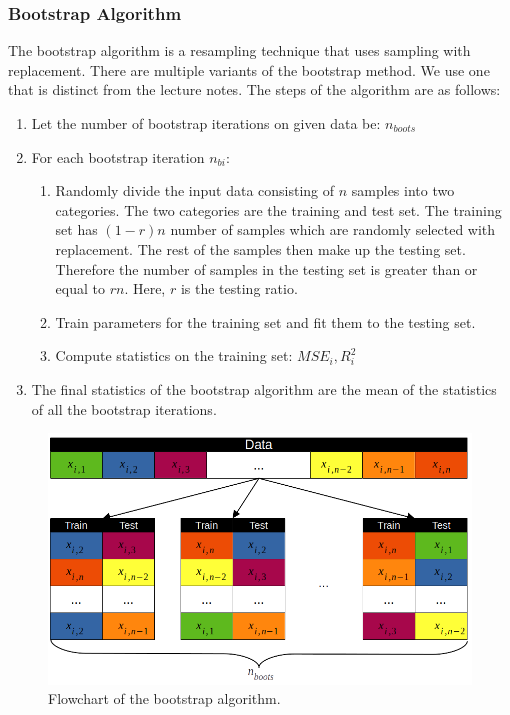 \subsubsection{Bootstrap Algorithm}\label{subsubsec:bootstrap}
The bootstrap algorithm is a resampling technique that uses sampling with replacement. There are multiple variants of the bootstrap method. We use one that is distinct from the lecture notes. \newline
The steps of the algorithm are as follows:
\begin{enumerate}
    \item Let the number of bootstrap iterations on given data be: $n_{boots}$
    \item For each bootstrap iteration $n_{bi}$:
    \begin{enumerate}
        \item Randomly divide the input data consisting of $n$ samples into two categories. The two categories are the training and test set. The training set has $(1-r)n$  number of samples which are randomly selected with replacement. The rest of the samples then make up the testing set. Therefore the number of samples in the testing set is greater than or equal to $rn$. Here, $r$ is the testing ratio.
        \item Train parameters for the training set and fit them to the testing set.
        \item Compute statistics on the training set: $MSE_i, R^2_i$
    \end{enumerate}
    \item The final statistics of the bootstrap algorithm are the mean of the statistics of all the bootstrap iterations.
\end{enumerate}

\begin{figure}[H]
    \centering
    \includegraphics[width=1\linewidth]{Images/bootstrap_diagram.png}
    \caption{Flowchart of the bootstrap algorithm.}
    \label{fig:bootstrap_algorithm}
\end{figure}

